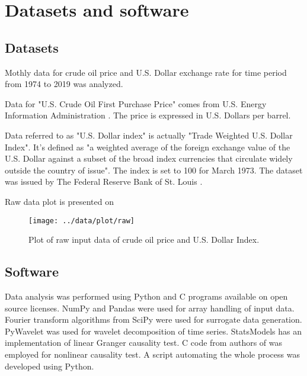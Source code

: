 \section{Datasets and software} \label{sec:data}

\subsection{Datasets}

Mothly data for crude oil price and U.S. Dollar exchange rate for time period from 1974 to 2019 was analyzed.

Data for "U.S. Crude Oil First Purchase Price" comes from U.S. Energy Information Administration \cite{crude-oil-data}. The price is expressed in U.S. Dollars per barrel.

Data referred to as "U.S. Dollar index" is actually "Trade Weighted U.S. Dollar Index".
It's defined as "a weighted average of the foreign exchange value of the U.S. Dollar against a subset of the broad index currencies that circulate widely outside the country of issue".
The index is set to 100 for March 1973.
The dataset was issued by The Federal Reserve Bank of St. Louis \cite{usd-data}.

Raw data plot is presented on 

\begin{figure}[h]
	\texttt{[image: ../data/plot/raw]}
	\caption{Plot of raw input data of crude oil price and U.S. Dollar Index.}
	\label{fig:raw-data}
\end{figure}


\subsection{Software}
Data analysis was performed using Python and C programs available on open source licenses.
NumPy \cite{numpy} and Pandas \cite{reback2020pandas} were used for array handling of input data.
Fourier transform algorithms from SciPy \cite{scipy} were used for surrogate data generation.
PyWavelet \cite{pywavelet} was used for wavelet decomposition of time series.
StatsModels \cite{statsmodels} has an implementation of linear Granger causality test.
C code from authors of \cite{diks-panchenko2004} was employed for nonlinear causality test.
A script automating the whole process was developed using Python.
